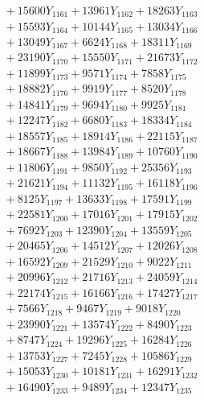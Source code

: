 \documentclass[a4paper,10pt]{article}
\begin{document}
{\begin{align}
&\;  + 15600 Y_{1161} + 13961 Y_{1162} + 18263 Y_{1163} \\[0.3ex]
&\;  + 15593 Y_{1164} + 10144 Y_{1165} + 13034 Y_{1166} \\[0.3ex]
&\;  + 13049 Y_{1167} + 6624 Y_{1168} + 18311 Y_{1169} \\[0.5ex]\allowbreak
&\;  + 23190 Y_{1170} + 15550 Y_{1171} + 21673 Y_{1172} \\[0.3ex]
&\;  + 11899 Y_{1173} + 9571 Y_{1174} + 7858 Y_{1175} \\[0.3ex]
&\;  + 18882 Y_{1176} + 9919 Y_{1177} + 8520 Y_{1178} \\[0.3ex]
&\;  + 14841 Y_{1179} + 9694 Y_{1180} + 9925 Y_{1181} \\[0.3ex]
&\;  + 12247 Y_{1182} + 6680 Y_{1183} + 18334 Y_{1184} \\[0.3ex]
&\;  + 18557 Y_{1185} + 18914 Y_{1186} + 22115 Y_{1187} \\[0.3ex]
&\;  + 18667 Y_{1188} + 13984 Y_{1189} + 10760 Y_{1190} \\[0.3ex]
&\;  + 11806 Y_{1191} + 9850 Y_{1192} + 25356 Y_{1193} \\[0.3ex]
&\;  + 21621 Y_{1194} + 11132 Y_{1195} + 16118 Y_{1196} \\[0.3ex]
&\;  + 8125 Y_{1197} + 13633 Y_{1198} + 17591 Y_{1199} \\[0.5ex]\allowbreak
&\;  + 22581 Y_{1200} + 17016 Y_{1201} + 17915 Y_{1202} \\[0.3ex]
&\;  + 7692 Y_{1203} + 12390 Y_{1204} + 13559 Y_{1205} \\[0.3ex]
&\;  + 20465 Y_{1206} + 14512 Y_{1207} + 12026 Y_{1208} \\[0.3ex]
&\;  + 16592 Y_{1209} + 21529 Y_{1210} + 9022 Y_{1211} \\[0.3ex]
&\;  + 20996 Y_{1212} + 21716 Y_{1213} + 24059 Y_{1214} \\[0.3ex]
&\;  + 22174 Y_{1215} + 16166 Y_{1216} + 17427 Y_{1217} \\[0.3ex]
&\;  + 7566 Y_{1218} + 9467 Y_{1219} + 9018 Y_{1220} \\[0.3ex]
&\;  + 23990 Y_{1221} + 13574 Y_{1222} + 8490 Y_{1223} \\[0.3ex]
&\;  + 8747 Y_{1224} + 19296 Y_{1225} + 16284 Y_{1226} \\[0.3ex]
&\;  + 13753 Y_{1227} + 7245 Y_{1228} + 10586 Y_{1229} \\[0.5ex]\allowbreak
&\;  + 15053 Y_{1230} + 10181 Y_{1231} + 16291 Y_{1232} \\[0.3ex]
&\;  + 16490 Y_{1233} + 9489 Y_{1234} + 12347 Y_{1235} \\[0.3ex]

\end{align}}
\end{document}
